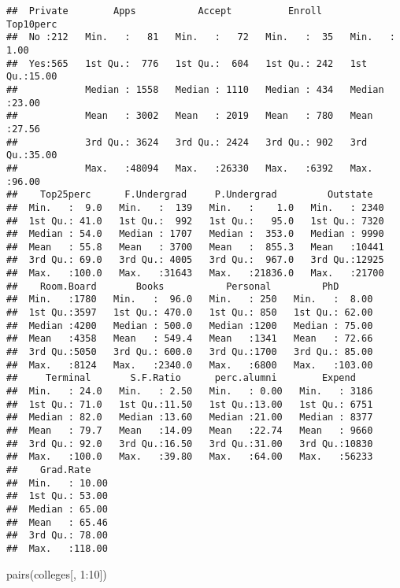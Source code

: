 \documentclass[
]{article}
\newenvironment{Shaded}{\begin{snugshade}}{\end{snugshade}}
\newcommand{\DecValTok}[1]{\textcolor[rgb]{0.00,0.00,0.81}{#1}}
\newcommand{\FunctionTok}[1]{\textcolor[rgb]{0.00,0.00,0.00}{#1}}
\newcommand{\NormalTok}[1]{#1}
\newcommand{\SpecialCharTok}[1]{\textcolor[rgb]{0.00,0.00,0.00}{#1}}
\begin{document}
\begin{verbatim}
##  Private        Apps           Accept          Enroll       Top10perc    
##  No :212   Min.   :   81   Min.   :   72   Min.   :  35   Min.   : 1.00  
##  Yes:565   1st Qu.:  776   1st Qu.:  604   1st Qu.: 242   1st Qu.:15.00  
##            Median : 1558   Median : 1110   Median : 434   Median :23.00  
##            Mean   : 3002   Mean   : 2019   Mean   : 780   Mean   :27.56  
##            3rd Qu.: 3624   3rd Qu.: 2424   3rd Qu.: 902   3rd Qu.:35.00  
##            Max.   :48094   Max.   :26330   Max.   :6392   Max.   :96.00  
##    Top25perc      F.Undergrad     P.Undergrad         Outstate    
##  Min.   :  9.0   Min.   :  139   Min.   :    1.0   Min.   : 2340  
##  1st Qu.: 41.0   1st Qu.:  992   1st Qu.:   95.0   1st Qu.: 7320  
##  Median : 54.0   Median : 1707   Median :  353.0   Median : 9990  
##  Mean   : 55.8   Mean   : 3700   Mean   :  855.3   Mean   :10441  
##  3rd Qu.: 69.0   3rd Qu.: 4005   3rd Qu.:  967.0   3rd Qu.:12925  
##  Max.   :100.0   Max.   :31643   Max.   :21836.0   Max.   :21700  
##    Room.Board       Books           Personal         PhD        
##  Min.   :1780   Min.   :  96.0   Min.   : 250   Min.   :  8.00  
##  1st Qu.:3597   1st Qu.: 470.0   1st Qu.: 850   1st Qu.: 62.00  
##  Median :4200   Median : 500.0   Median :1200   Median : 75.00  
##  Mean   :4358   Mean   : 549.4   Mean   :1341   Mean   : 72.66  
##  3rd Qu.:5050   3rd Qu.: 600.0   3rd Qu.:1700   3rd Qu.: 85.00  
##  Max.   :8124   Max.   :2340.0   Max.   :6800   Max.   :103.00  
##     Terminal       S.F.Ratio      perc.alumni        Expend     
##  Min.   : 24.0   Min.   : 2.50   Min.   : 0.00   Min.   : 3186  
##  1st Qu.: 71.0   1st Qu.:11.50   1st Qu.:13.00   1st Qu.: 6751  
##  Median : 82.0   Median :13.60   Median :21.00   Median : 8377  
##  Mean   : 79.7   Mean   :14.09   Mean   :22.74   Mean   : 9660  
##  3rd Qu.: 92.0   3rd Qu.:16.50   3rd Qu.:31.00   3rd Qu.:10830  
##  Max.   :100.0   Max.   :39.80   Max.   :64.00   Max.   :56233  
##    Grad.Rate     
##  Min.   : 10.00  
##  1st Qu.: 53.00  
##  Median : 65.00  
##  Mean   : 65.46  
##  3rd Qu.: 78.00  
##  Max.   :118.00
\end{verbatim}

\begin{Shaded}
\begin{Highlighting}[]
\FunctionTok{pairs}\NormalTok{(colleges[, }\DecValTok{1}\SpecialCharTok{:}\DecValTok{10}\NormalTok{])}
\end{Highlighting}
\end{Shaded}
\end{document}
